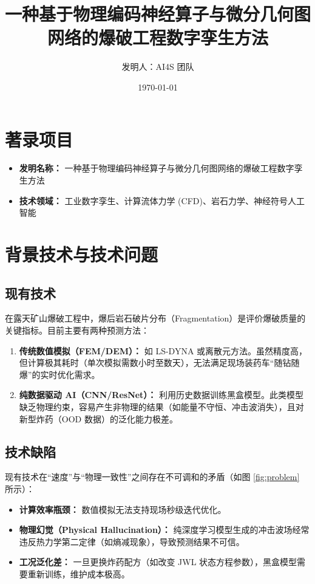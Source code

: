 \documentclass[a4paper,12pt]{article}
\title{\textbf{一种基于物理编码神经算子与微分几何图网络的爆破工程数字孪生方法}}
\author{发明人：AI4S 团队}
\date{\today}
\begin{document}
\maketitle

\section{著录项目}
\begin{itemize}
    \item \textbf{发明名称：} 一种基于物理编码神经算子与微分几何图网络的爆破工程数字孪生方法
    \item \textbf{技术领域：} 工业数字孪生、计算流体力学 (CFD)、岩石力学、神经符号人工智能
\end{itemize}

\section{背景技术与技术问题}

\subsection{现有技术}
在露天矿山爆破工程中，爆后岩石破片分布（Fragmentation）是评价爆破质量的关键指标。目前主要有两种预测方法：
\begin{enumerate}
    \item \textbf{传统数值模拟（FEM/DEM）：} 如 LS-DYNA 或离散元方法。虽然精度高，但计算极其耗时（单次模拟需数小时至数天），无法满足现场装药车“随钻随爆”的实时优化需求。
    \item \textbf{纯数据驱动 AI（CNN/ResNet）：} 利用历史数据训练黑盒模型。此类模型缺乏物理约束，容易产生非物理的结果（如能量不守恒、冲击波消失），且对新型炸药（OOD 数据）的泛化能力极差。
\end{enumerate}

\subsection{技术缺陷}
现有技术在“速度”与“物理一致性”之间存在不可调和的矛盾（如图 \ref{fig:problem} 所示）：
\begin{itemize}
    \item \textbf{计算效率瓶颈：} 数值模拟无法支持现场秒级迭代优化。
    \item \textbf{物理幻觉（Physical Hallucination）：} 纯深度学习模型生成的冲击波场经常违反热力学第二定律（如熵减现象），导致预测结果不可信。
    \item \textbf{工况泛化差：} 一旦更换炸药配方（如改变 JWL 状态方程参数），黑盒模型需要重新训练，维护成本极高。
\end{itemize}
\end{document}
